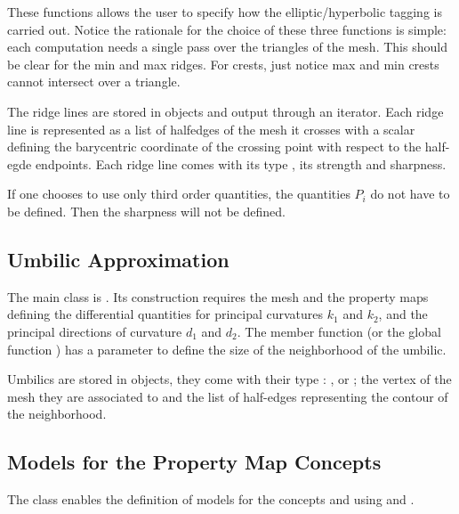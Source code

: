 These functions allows the user to specify how the elliptic/hyperbolic
tagging is carried out.
Notice the rationale for the choice of these three functions is
simple: each computation needs a single pass over the triangles of the
mesh. This should be clear for the min and max ridges. For crests,
just notice max and min crests cannot intersect over a triangle.
\medskip

The ridge lines are stored in
 objects and output through an iterator. 
Each ridge line is represented as a list of halfedges of the mesh it
crosses with a scalar defining the barycentric coordinate of the
crossing point with respect to the half-egde endpoints. Each ridge
line comes with its type , its strength and sharpness.

If one chooses to use only third order quantities, the quantities
$P_i$ do not have to be defined. Then the sharpness will not be
defined.

\subsection{Umbilic Approximation}
The main class is
.
Its construction requires the mesh and the property maps defining the
differential quantities for principal curvatures $k_1$ and $k_2$, and
the principal directions of curvature $d_1$ and $d_2$.  The member
function  (or the global function )
has a parameter to define the size of the neighborhood of the umbilic.

Umbilics are stored in  objects, they come with their
type : ,  or
; the vertex of the mesh they are associated
to and the list of half-edges representing the contour of the
neighborhood.

\subsection{Models for the Property Map Concepts}
The class
enables the definition of models for the concepts
 and
using  and .


